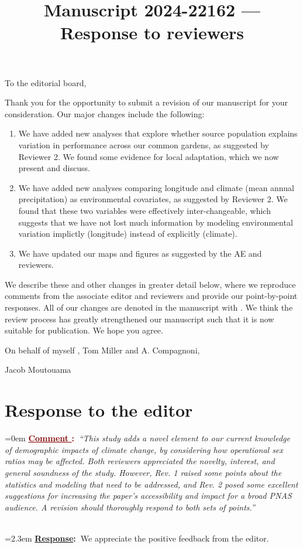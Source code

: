 \documentclass[12pt]{article}
\newcounter{cN}
\newcommand{\comment}[1]{
	\vspace{2em}
	\refstepcounter{cN} %
	\noindent \hangindent=0em \textbf{\textcolor{Maroon}{\uline{Comment \thecN}:~}}\emph{``#1''}
	}
\newcommand{\response}[1]{
	\\[0.25em]
	\hangindent=2.3em \textbf{\textcolor{NavyBlue}{\uline{Response}:~}}#1
	}
\newcommand{\revise}[1]{{\color{Mahogany}{#1}}}
\begin{document}
\title{Manuscript 2024-22162 --- Response to reviewers}

\maketitle
\noindent To the editorial board,

Thank you for the opportunity to submit a revision of our manuscript for your consideration. Our major changes include the following:
\begin{enumerate}
	\item We have added new analyses that explore whether source population explains variation in performance across our common gardens, as suggested by Reviewer 2. We found some evidence for local adaptation, which we now present and discuss. 
	\item We have added new analyses comparing longitude and climate (mean annual precipitation) as environmental covariates, as suggested by Reviewer 2. We found that these two variables were effectively inter-changeable, which suggests that we have not lost much information by modeling environmental variation implictly (longitude) instead of explicitly (climate).
	\item We have updated our maps and figures as suggested by the AE and reviewers.
\end{enumerate}

We describe these and other changes in greater detail below, where we reproduce comments from the associate editor and reviewers and provide our point-by-point responses. 
All of our changes are denoted in the manuscript with \revise{Mahogany font}.
We think the review process has greatly strengthened our manuscript such that it is now suitable for publication.
We hope you agree. 

\vspace{2em}
\hfill On behalf of myself , Tom Miller and A. Compagnoni,

\hfill  Jacob Moutouama
\newpage

\section{Response to  the editor}
\vspace{-2em}

\comment{This study adds a novel element to our current knowledge of demographic impacts of climate change, by considering how operational sex ratios may be affected. Both reviewers appreciated the novelty, interest, and general soundness of the study. However, Rev. 1 raised some points about the statistics and modeling that need to be addressed, and Rev. 2 posed some excellent suggestions for increasing the paper's accessibility and impact for a broad PNAS audience. A revision should thoroughly respond to both sets of points.}
\response{We appreciate the positive feedback from the editor.}
\end{document}
